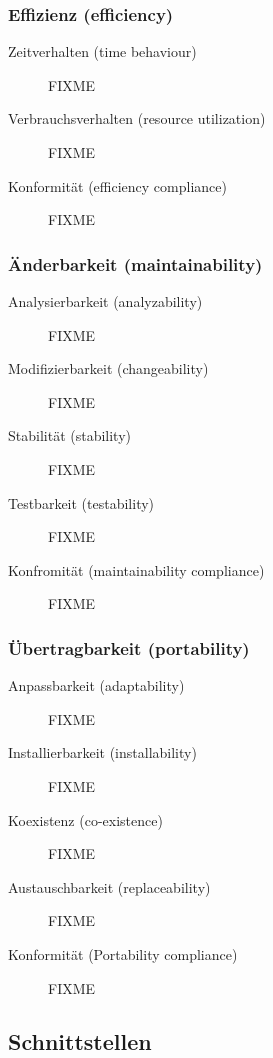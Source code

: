 \documentclass[a4paper]{article}
\begin{document}
\subsubsection{Effizienz (efficiency)}

\begin{description}
  \item[Zeitverhalten (time behaviour)]
    FIXME
  \item[Verbrauchsverhalten (resource utilization)]
    FIXME
  \item[Konformität (efficiency compliance)]
    FIXME
\end{description}

\subsubsection{Änderbarkeit (maintainability)}

\begin{description}
  \item[Analysierbarkeit (analyzability)]
    FIXME
  \item[Modifizierbarkeit (changeability)]
    FIXME
  \item[Stabilität (stability)]
    FIXME
  \item[Testbarkeit (testability)]
    FIXME
  \item[Konfromität (maintainability compliance)]
    FIXME
\end{description}

\subsubsection{Übertragbarkeit (portability)}

\begin{description}
  \item[Anpassbarkeit (adaptability)]
    FIXME
  \item[Installierbarkeit (installability)]
    FIXME
  \item[Koexistenz (co-existence)]
    FIXME
  \item[Austauschbarkeit (replaceability)]
    FIXME
  \item[Konformität (Portability compliance)]
    FIXME
\end{description}

\subsection{Schnittstellen}
\end{document}
